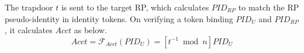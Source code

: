 



The trapdoor $t$ is sent to the target RP,
which calculates $PID_{RP}$ to match the RP pseudo-identity in identity tokens.
On verifying a token binding $PID_U$ and $PID_{RP}$,
    it calculates $Acct$ as below.
\begin{equation}
Acct = \mathcal{F}_{Acct}(PID_{U})
   = [t^{-1} \bmod n]PID_{U}
   \label{equ:Account}
\end{equation}


